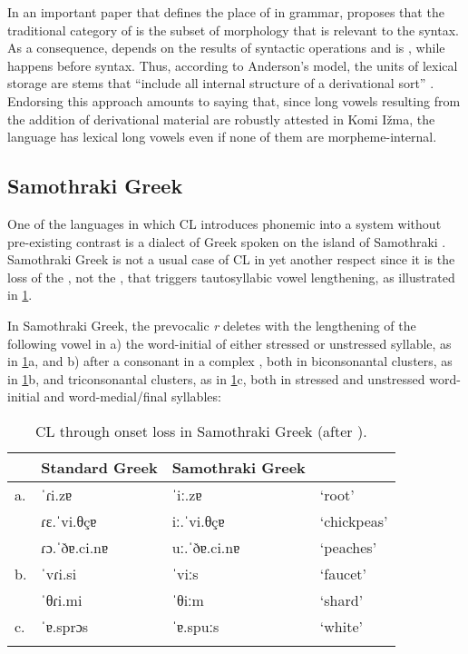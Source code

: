 \documentclass[output=paper,
modfonts
]{LSP/langsci}
\begin{document}
In an important paper that defines the place of  in grammar,
\citet{anderson1982} proposes that the traditional category of  is
the subset of morphology that is relevant to the syntax. As a
consequence,  depends on the results of syntactic operations
and is , while  happens before syntax. Thus,
according to Anderson's model, the units of lexical storage are stems
that ``include all internal structure of a derivational sort'' \citep[592]{anderson1982}. Endorsing this approach amounts to saying that, since long
vowels resulting from the addition of derivational material are robustly
attested in Komi Ižma, the language has lexical long vowels even if none
of them are morpheme-internal.

\subsection{Samothraki Greek}

One of the languages in which CL introduces phonemic  into a
system without pre-existing  contrast is a dialect of Greek
spoken on the island of Samothraki \citep{newton1972b,newton1972a,hayes1989k,katsanis1996,sumner1999,kavitskaya2002,topintzi2006k,kiparsky2011k,katsika2015}. Samothraki Greek is not a usual case
of CL in yet another respect since it is the loss of the , not the
, that triggers tautosyllabic vowel lengthening, as illustrated in
\cref{tab:clolosssamgk}.

In Samothraki Greek, the prevocalic \emph{r} deletes with the
lengthening of the following vowel in a) the  word-initial
  of either stressed or unstressed syllable, as in \cref{tab:clolosssamgk}a,
and b) after a consonant in a complex , both in biconsonantal
clusters, as in \cref{tab:clolosssamgk}b, and triconsonantal clusters, as in \cref{tab:clolosssamgk}c, both
in stressed and unstressed word-initial and word-medial/final syllables:

\begin{table}
\begin{tabular}{llll}
\lsptoprule
	&	Standard Greek	&	Samothraki Greek	&		\\
\midrule
a.	&	 ˈɾi.zɐ 			&	ˈiː.zɐ 			&	`root' \\
	&	ɾɛ.ˈvi.θçɐ 		&	iː.ˈvi.θçɐ 		&	`chickpeas'\\
	&	ɾɔ.ˈðɐ.ci.nɐ 	&	uː.ˈðɐ.ci.nɐ 		&	`peaches'\\[0.75ex]
b.	&	ˈvɾi.si 			&	ˈviːs 			&	`faucet'\\
	&	ˈθɾi.mi			&	 ˈθiːm 			&	`shard'\\[0.75ex]
c.	&	 ˈɐ.sprɔs 		&	ˈɐ.spuːs 			&	`white' \\
\lspbottomrule
\end{tabular}
\caption{CL through onset loss in Samothraki Greek (after \citealt{katsika2015}).\protect\footnotemark}
\label{tab:clolosssamgk}
\end{table}
\end{document}

